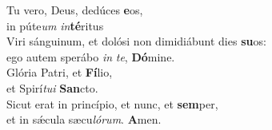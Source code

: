 \evenverse Tu vero, Deus, dedúces \textbf{e}os,~\*\\
\evenverse in púte\textit{um} \textit{in}\textbf{té}ritus\\
\oddverse Viri sánguinum, et dolósi non dimidiábunt dies \textbf{su}os:~\*\\
\oddverse ego autem sperábo \textit{in} \textit{te}, \textbf{Dó}mine.\\
\evenverse Glória Patri, et \textbf{Fí}lio,~\*\\
\evenverse et Spirí\textit{tu}\textit{i} \textbf{San}cto.\\
\oddverse Sicut erat in princípio, et nunc, et \textbf{sem}per,~\*\\
\oddverse et in sǽcula sæcu\textit{ló}\textit{rum}. \textbf{A}men.\\
